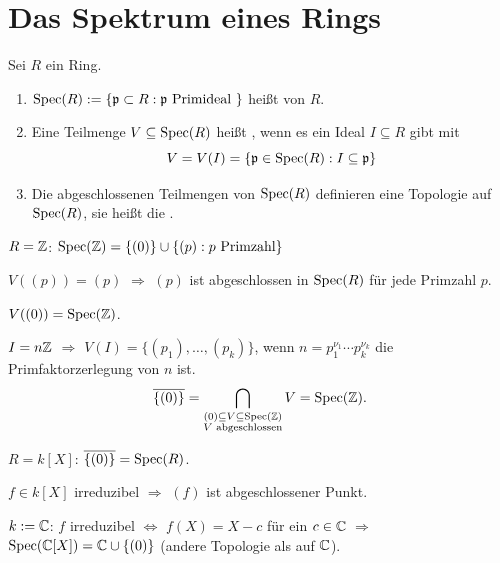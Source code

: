 \documentclass[a4paper, 10pt]{report}
\begin{document}
\section{Das Spektrum eines Rings}

\begin{DefBem}
Sei $R$ ein Ring.

\begin{enumerate}
\item $\mathrm{Spec}(R) := \{ \mathfrak{p} \subset R : \mathfrak{p} \text{ Primideal } \}$ hei\ss t  von $R$.

\item Eine Teilmenge $V \subseteq \mathrm{Spec}(R)$ hei\ss t , wenn es ein Ideal $I \subseteq R$ gibt mit
$$V = V(I) = \{ \mathfrak{p} \in \mathrm{Spec}(R) : I \subseteq \mathfrak{p} \}$$

\item Die abgeschlossenen Teilmengen von $\mathrm{Spec}(R)$ definieren eine Topologie auf $\mathrm{Spec}(R)$, sie hei\ss t die .
\end{enumerate}
\end{DefBem}

\begin{nnBsp}
$R = \mathbb{Z}$: $\mathrm{Spec}(\mathbb{Z}) = \{ (0) \} \cup \{ (p) : p \text{ Primzahl} \}$

$V( (p) ) = (p)$ $\Rightarrow$ $(p)$ ist abgeschlossen in $\mathrm{Spec}(R)$ f\"ur jede Primzahl $p$.

$V( (0) ) = \mathrm{Spec}(\mathbb{Z})$.

$I = n \mathbb{Z}$ $\Rightarrow$ $V(I) = \{ (p_1), \ldots, (p_k) \}$, wenn $n = p_1^{\nu_1} \cdots p_k^{\nu_k}$ die Primfaktorzerlegung von $n$ ist.
\[
\overline{ \{ (0) \} } = \bigcap_{\substack{(0)\subseteq V\subseteq \mathrm{Spec}(\mathbb{Z})\\ V
\text{ abgeschlossen}}} V = \mathrm{Spec}(\mathbb{Z}).
\]
\bigskip

$R = k[X]$: $\overline{ \{ (0) \} } = \mathrm{Spec}(R)$.

$f \in k[X]$ irreduzibel $\Rightarrow$ $(f)$ ist abgeschlossener Punkt.

$k := \mathbb{C}$: $f$ irreduzibel $\Leftrightarrow$ $f(X) = X - c$ f\"ur ein $c \in
\mathbb{C}$ $\Rightarrow$ $\mathrm{Spec}(\mathbb{C}[X]) = \mathbb{C} \cup \{ (0) \}$ (andere Topologie als
auf $\mathbb{C}$).

\end{nnBsp}
\end{document}
